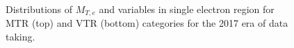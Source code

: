 \begin{figure}[htbp]
{    }
  \caption{Distributions of $M_{T,e}$ and \mindphinoe variables in single electron region for MTR (top) and VTR (bottom) categories for the 2017 era of data taking.}
  \label{fig:2017_Wenu_2}
\end{figure}

